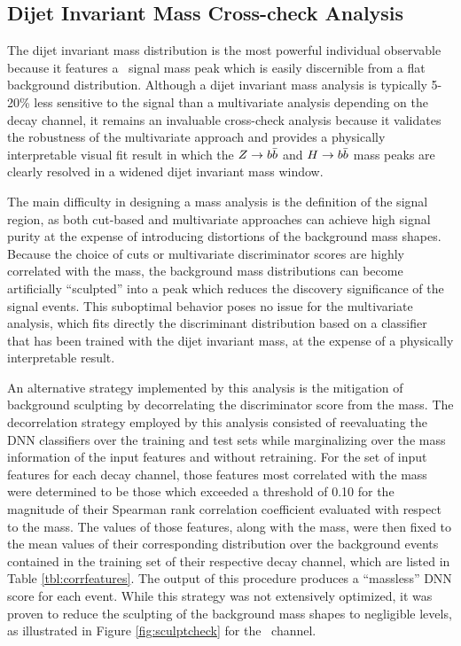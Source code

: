 \subsection{Dijet Invariant Mass Cross-check Analysis}

The dijet invariant mass distribution is the most powerful individual observable because it features a \VHbb\ signal mass peak which is easily discernible from a flat background distribution. Although a dijet invariant mass analysis is typically 5-20\% less sensitive to the signal than a multivariate analysis depending on the decay channel, it remains an invaluable cross-check analysis because it validates the robustness of the multivariate approach and provides a physically interpretable visual fit result in which the $Z \rightarrow b\bar{b}$ and $H \rightarrow b\bar{b}$ mass peaks are clearly resolved in a widened dijet invariant mass window.

The main difficulty in designing a mass analysis is the definition of the signal region, as both cut-based and multivariate approaches can achieve high signal purity at the expense of introducing distortions of the background mass shapes. Because the choice of cuts or multivariate discriminator scores are highly correlated with the mass, the background mass distributions can become artificially ``sculpted'' into a peak which reduces the discovery significance of the signal events. This suboptimal behavior poses no issue for the multivariate analysis, which fits directly the discriminant distribution based on a classifier that has been trained with the dijet invariant mass, at the expense of a physically interpretable result.

An alternative strategy implemented by this analysis is the mitigation of background sculpting by decorrelating the discriminator score from the mass. The decorrelation strategy employed by this analysis consisted of reevaluating the DNN classifiers over the training and test sets while marginalizing over the mass information of the input features and without retraining. For the set of input features for each decay channel, those features most correlated with the mass were determined to be those which exceeded a threshold of 0.10 for the magnitude of their Spearman rank correlation coefficient evaluated with respect to the mass. The values of those features, along with the mass, were then fixed to the mean values of their corresponding distribution over the background events contained in the training set of their respective decay channel, which are listed in Table \ref{tbl:corrfeatures}. The output of this procedure produces a ``massless'' DNN score for each event. While this strategy was not extensively optimized, it was proven to reduce the sculpting of the background mass shapes to negligible levels, as illustrated in Figure \ref{fig:sculptcheck} for the \ZnnH\ channel.

